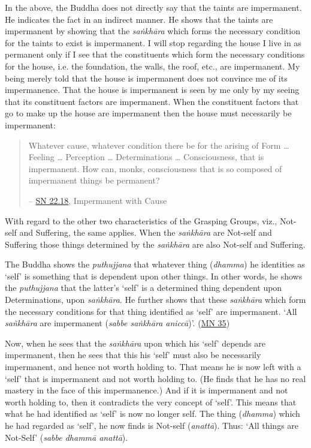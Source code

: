 In the above, the Buddha does not directly say that the taints are impermanent. He indicates the fact in an indirect manner. He shows that the taints are impermanent by showing that the \emph{saṅkhāra} which forms the necessary condition for the taints to exist is impermanent. I will stop regarding the house I live in as permanent only if I see that the constituents which form the necessary conditions for the house, i.e. the foundation, the walls, the roof, etc., are impermanent. My being merely told that the house is impermanent does not convince me of its impermanence. That the house is impermanent is seen by me only by my seeing that its constituent factors are impermanent. When the constituent factors that go to make up the house are impermanent then the house must necessarily be impermanent:

\begin{quote}
Whatever cause, whatever condition there be for the arising of Form \ldots\hspace{0pt} Feeling \ldots\hspace{0pt} Perception \ldots\hspace{0pt} Determinations \ldots\hspace{0pt} Consciousness, that is impermanent. How can, monks, consciousness that is so composed of impermanent things be permanent?

 -- \href{https://suttacentral.net/sn22.18/en/bodhi}{SN 22.18}, Impermanent with Cause
\end{quote}

With regard to the other two characteristics of the Grasping Groups, viz., Not-self and Suffering, the same applies. When the \emph{saṅkhāra} are Not-self and Suffering those things determined by the \emph{saṅkhāra} are also Not-self and Suffering.

The Buddha shows the \emph{puthujjana} that whatever thing (\emph{dhamma}) he identities as `self' is something that is dependent upon other things. In other words, he shows the \emph{puthujjana} that the latter's `self' is a determined thing dependent upon Determinations, upon \emph{saṅkhāra}. He further shows that these \emph{saṅkhāra} which form the necessary conditions for that thing identified as `self' are impermanent. `All \emph{sañkhāra} are impermanent (\emph{sabbe saṅkhāra aniccā})'. (\href{https://suttacentral.net/mn35/en/sujato}{MN 35})

Now, when he sees that the \emph{saṅkhāra} upon which his `self' depends are impermanent, then he sees that this his `self' must also be necessarily impermanent, and hence not worth holding to. That means he is now left with a `self' that is impermanent and not worth holding to. (He finds that he has no real mastery in the face of this impermanence.) And if it is impermanent and not worth holding to, then it contradicts the very concept of `self'. This means that what he had identified as `self' is now no longer self. The thing (\emph{dhamma}) which he had regarded as `self', he now finds is Not-self (\emph{anattā}). Thus: `All things are Not-Self' (\emph{sabbe dhammā anattā}).

